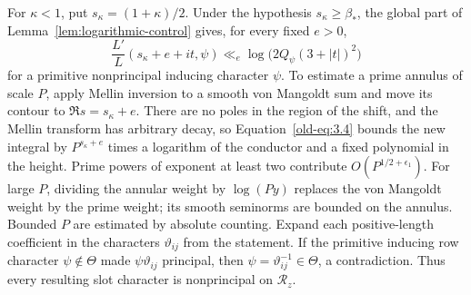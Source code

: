\documentclass[11pt,a4paper]{article}
\numberwithin{equation}{section}
\numberwithin{figure}{section}
\theoremstyle{definition}
\theoremstyle{remark}
\begin{document}
For \(\kappa<1\), put \(s_\kappa=(1+\kappa)/2\).  Under the hypothesis
\(s_\kappa\ge\beta_*\), the global part of
Lemma~\ref{lem:logarithmic-control} gives, for every fixed \(e>0\),
\begin{equation}
 \frac{L'}{L}(s_\kappa+e+it,\psi)
 \ll_e \log\!\bigl(2Q_\psi(3+|t|)^2\bigr)
 \label{old-eq:3.4}
\end{equation}
for a primitive nonprincipal inducing character \(\psi\).
To estimate a prime annulus of scale \(P\), apply Mellin inversion to
a smooth von Mangoldt sum and move its contour to
\(\Re s=s_\kappa+e\).  There are no poles in the region of the shift,
and the Mellin transform has arbitrary decay, so
Equation~\eqref{old-eq:3.4} bounds the new integral by
\(P^{s_\kappa+e}\) times a logarithm of the conductor and a fixed
polynomial in the height.  Prime powers of exponent at least two
contribute \(O(P^{1/2+\epsilon_1})\).  For large \(P\), dividing the
annular weight by \(\log(Py)\) replaces the von Mangoldt weight by
the prime weight; its smooth seminorms are bounded on the annulus.
Bounded \(P\) are estimated by absolute counting.  Expand each
positive-length coefficient in the characters \(\vartheta_{ij}\)
from the statement.  If the primitive inducing row character
\(\psi\notin\Theta\) made \(\psi\vartheta_{ij}\) principal, then
\(\psi=\vartheta_{ij}^{-1}\in\Theta\), a contradiction.  Thus
every resulting slot character is nonprincipal on \(\mathcal R_z\).
\end{document}
